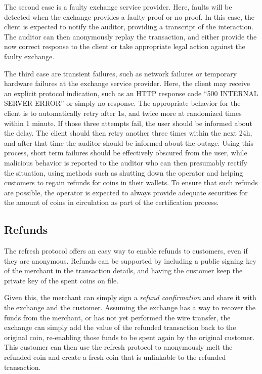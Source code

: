 \documentclass{llncs}
\begin{document}
The second case is a faulty exchange service provider.  Here, faults
will be detected when the exchange provides a faulty proof or no
proof.  In this case, the client is expected to notify the auditor,
providing a transcript of the interaction.  The auditor can then
anonymously replay the transaction, and either provide the now correct
response to the client or take appropriate legal action against the
faulty exchange.

The third case are transient failures, such as network failures or
temporary hardware failures at the exchange service provider.  Here, the
client may receive an explicit protocol indication, such as an HTTP
response code ``500 INTERNAL SERVER ERROR'' or simply no response.
The appropriate behavior for the client is to automatically retry
after 1s, and twice more at randomized times within 1 minute.
If those three attempts fail, the user should be informed about the
delay.  The client should then retry another three times within the
next 24h, and after that time the auditor should be informed about the outage.
Using this process, short term failures should be effectively obscured
from the user, while malicious behavior is reported to the auditor who
can then presumably rectify the situation, using methods such as
shutting down the operator and helping customers to regain refunds for
coins in their wallets.  To ensure that such refunds are possible, the
operator is expected to always provide adequate securities for the
amount of coins in circulation as part of the certification process.




\subsection{Refunds}

The refresh protocol offers an easy way to enable refunds to
customers, even if they are anonymous.  Refunds can be supported
by including a public signing key of the merchant in the transaction
details, and having the customer keep the private key of the spent
coins on file.

Given this, the merchant can simply sign a {\em refund confirmation}
and share it with the exchange and the customer.  Assuming the
exchange has a way to recover the funds from the merchant, or has not
yet performed the wire transfer, the exchange can simply add the value
of the refunded transaction back to the original coin, re-enabling
those funds to be spent again by the original customer.  This customer
can then use the refresh protocol to anonymously melt the refunded
coin and create a fresh coin that is unlinkable to the refunded
transaction.
\end{document}
